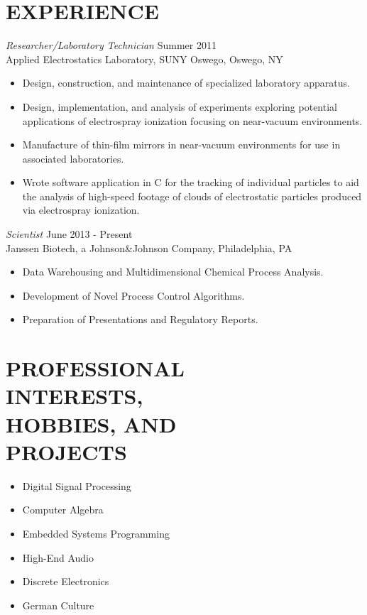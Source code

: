 \documentclass[line,margin]{res}
\begin{document}
\begin{resume}
\section{EXPERIENCE} {\sl Researcher/Laboratory Technician} \hfill Summer 2011 \\
                Applied Electrostatics Laboratory, 
                SUNY Oswego, Oswego, NY
                 \begin{itemize}  \itemsep -2pt %
                \item   Design, construction, and maintenance of 
				        specialized laboratory apparatus.
                \item   Design, implementation, and analysis of
				        experiments exploring potential applications
						of electrospray ionization focusing
						on near-vacuum environments.
				\item   Manufacture of thin-film mirrors in
				        near-vacuum environments for use in
						associated laboratories.
				\item   Wrote software application in C
						for the tracking of individual particles
						to aid the analysis of high-speed footage
						of clouds of electrostatic particles
						produced via electrospray ionization.
                \end{itemize}
		{\sl Scientist} \hfill June 2013 - Present \\
		Janssen Biotech, a Johnson\&Johnson Company,
		Philadelphia, PA
		\begin{itemize}  \itemsep -2pt
		\item   Data Warehousing and Multidimensional Chemical Process Analysis.
		\item   Development of Novel Process Control Algorithms.
		\item   Preparation of Presentations and Regulatory Reports.
		\end{itemize}

\section{PROFESSIONAL \\ INTERESTS, \\ HOBBIES, AND \\ PROJECTS}
				\begin{itemize} \itemsep -2pt
				\item	Digital Signal Processing
				\item	Computer Algebra
				\item	Embedded Systems Programming
				\item	High-End Audio
				\item	Discrete Electronics
				\item	German Culture
				\end{itemize}


\end{resume}
\end{document}
